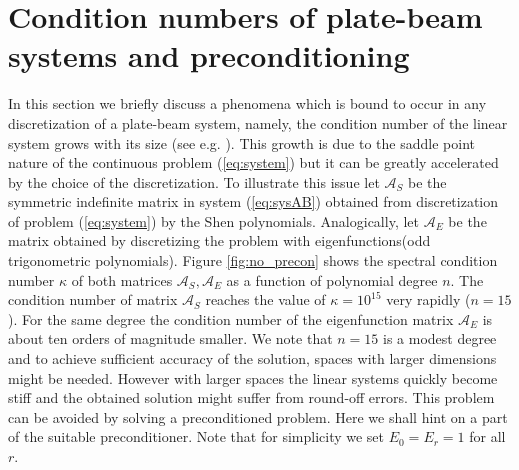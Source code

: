 \documentclass{marine_2015}
\begin{document}
\section{Condition numbers of plate-beam systems and preconditioning}
\label{sec:lbb}
In this section we briefly discuss a phenomena which is bound to occur in any
discretization of a plate-beam system, namely, the condition number of the linear system 
grows with its size (see e.g. \cite{benzi}). This growth is due to the saddle point 
nature of the continuous problem (\ref{eq:system}) but it can be greatly accelerated 
by the choice of the discretization. To illustrate this issue let $\mathcal{A}_S$ be the symmetric
indefinite matrix in system (\ref{eq:sysAB}) obtained from discretization of
problem (\ref{eq:system}) by the Shen polynomials. Analogically, let
$\mathcal{A}_E$ be the matrix obtained by discretizing the problem with
eigenfunctions(odd trigonometric polynomials). Figure \ref{fig:no_precon} shows the 
spectral condition number $\kappa$ of both matrices $\mathcal{A}_S, \mathcal{A}_E$ 
as a function of polynomial degree $n$. The condition number of matrix
$\mathcal{A}_S$ reaches the value of $\kappa=10^{15}$ very rapidly ($n=15$). For
the same degree the condition number of the eigenfunction matrix $\mathcal{A}_E$ is about ten 
orders of magnitude smaller. We note that $n=15$ is a modest degree and to achieve
sufficient accuracy of the solution, spaces with larger dimensions might be
needed. However with larger spaces the linear systems quickly become stiff and
the obtained solution might suffer from round-off errors. This problem can be
avoided by solving a preconditioned problem. Here we shall hint on a part of the
suitable preconditioner. Note that for simplicity we set $E_0=E_r=1$ for all $r$.
\end{document}
